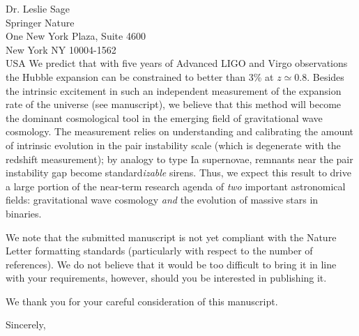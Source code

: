 \documentclass{letter}
\begin{document}
\begin{letter}{Dr. Leslie Sage\\Springer Nature\\One New York Plaza, Suite 4600\\New York NY 10004-1562\\USA}
We predict that with five years of Advanced LIGO and Virgo observations the
Hubble expansion can be constrained to better than 3\% at $z \simeq 0.8$.
Besides the intrinsic excitement in such an independent measurement of the
expansion rate of the universe (see manuscript), we believe that this method
will become the dominant cosmological tool in the emerging field of
gravitational wave cosmology.  The measurement relies on understanding and
calibrating the amount of intrinsic evolution in the pair instability scale
(which is degenerate with the redshift measurement); by analogy to type Ia
supernovae, remnants near the pair instability gap become standard\emph{izable}
sirens.  Thus, we expect this result to drive a large portion of the near-term
research agenda of \emph{two} important astronomical fields: gravitational wave
cosmology \emph{and} the evolution of massive stars in binaries.

We note that the submitted manuscript is not yet compliant with the Nature
Letter formatting standards (particularly with respect to the number of
references).  We do not believe that it would be too difficult to bring it in
line with your requirements, however, should you be interested in publishing it.

We thank you for your careful consideration of this manuscript.

\closing{Sincerely,}

\end{letter}
\end{document}
